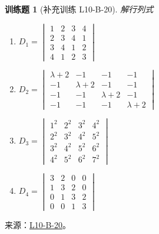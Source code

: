 \documentclass[12pt,fontset=fandol]{ctexart}
\newtheorem{exercise}{训练题}[section]
\begin{document}
\begin{exercise}[补充训练 L10-B-20]\label{prob:L10-B-20}
解行列式
        \begin{enumerate} 
                \item $ D_1=\begin{vmatrix}
                        1 & 2 & 3 & 4 \\2&3&4&1\\3&4&1&2\\4&1&2&3
                    \end{vmatrix} $

                \item $ D_2=\begin{vmatrix}
                        \lambda+2 & -1        & -1        & -1        \\
                        -1        & \lambda+2 & -1        & -1        \\
                        -1        & -1        & \lambda+2 & -1        \\
                        -1        & -1        & -1        & \lambda+2
                    \end{vmatrix} $

              

                \item $ D_3=\begin{vmatrix}
                        1^{2} & 2^{2} & 3^{2} & 4^{2} \\
                        2^{2} & 3^{2} & 4^{2} & 5^{2} \\
                        3^{2} & 4^{2} & 5^{2} & 6^{2} \\
                        4^{2} & 5^{2} & 6^{2} & 7^{2}
                    \end{vmatrix} $

                \item $ D_4=\begin{vmatrix}
                        3 & 2 & 0 & 0 \\
                        1 & 3 & 2 & 0 \\
                        0 & 1 & 3 & 2 \\
                        0 & 0 & 1 & 3
                    \end{vmatrix} $
             \end{enumerate}
\end{exercise}
\noindent 来源：\href{https://github.com/yhwu-is/Linear-Algebra-Left-Undone/blob/new/%E8%AE%B2%E4%B9%89/%E4%B8%93%E9%A2%98/10%20%E8%A1%8C%E5%88%97%E5%BC%8F.tex}{L10-B-20}。
\end{document}
